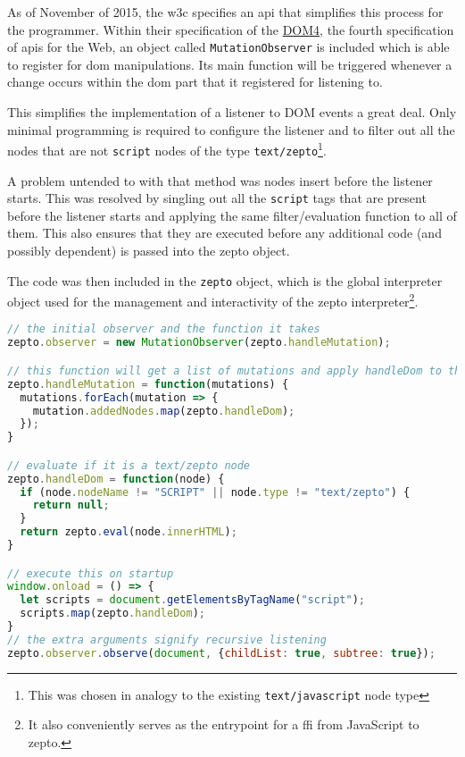 \documentclass[oneside,11pt,xetex]{scrbook}
\begin{document}
\begin{onehalfspace}
As of November of 2015, the \gls{w3c} specifies an \gls{api} that simplifies this process for the programmer.
Within their specification of the \href{https://www.w3.org/TR/dom/#mutationobserver}{DOM4}, the fourth
specification of \gls{apis} for the Web, an object called \texttt{MutationObserver} is included which
is able to register for \gls{dom} manipulations. Its main function will be triggered whenever a change
occurs within the \gls{dom} part that it registered for listening to.

This simplifies the implementation of a listener to DOM events a great deal. Only minimal programming
is required to configure the listener and to filter out all the nodes that are not \texttt{script} nodes
of the type \texttt{text/zepto}\footnote{This was chosen in analogy to the existing \texttt{text/javascript}
node type}.

A problem untended to with that method was nodes insert before the listener starts. This was resolved by
singling out all the \texttt{script} tags that are present before the listener starts and applying the
same filter/evaluation function to all of them. This also ensures that they are executed before any
additional code (and possibly dependent) is passed into the zepto object.

The code was then included in the \texttt{zepto} object, which is the global interpreter object
used for the management and interactivity of the zepto interpreter\footnote{It also conveniently
serves as the entrypoint for a \gls{ffi} from JavaScript to zepto.}.

\begin{lstlisting}[language=JavaScript,caption=The final mutation observer code (simplified)]
// the initial observer and the function it takes
zepto.observer = new MutationObserver(zepto.handleMutation);

// this function will get a list of mutations and apply handleDom to them
zepto.handleMutation = function(mutations) {
  mutations.forEach(mutation => {
    mutation.addedNodes.map(zepto.handleDom);
  });
}

// evaluate if it is a text/zepto node
zepto.handleDom = function(node) {
  if (node.nodeName != "SCRIPT" || node.type != "text/zepto") {
    return null;
  }
  return zepto.eval(node.innerHTML);
}

// execute this on startup
window.onload = () => {
  let scripts = document.getElementsByTagName("script");
  scripts.map(zepto.handleDom);
}
// the extra arguments signify recursive listening
zepto.observer.observe(document, {childList: true, subtree: true});
\end{lstlisting}


\end{onehalfspace}
\end{document}
